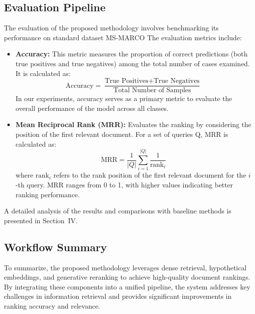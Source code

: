 \subsection{Evaluation Pipeline}
The evaluation of the proposed methodology involves benchmarking its performance on standard dataset MS-MARCO\cite{ms-marco} The evaluation metrics include:
\begin{itemize}
       \item \textbf{Accuracy:} This metric measures the proportion of correct predictions (both true positives and true negatives) among the total number of cases examined. It is calculated as:
    \begin{equation}
        \text{Accuracy} = \frac{\text{True Positives} + \text{True Negatives}}{\text{Total Number of Samples}}
    \end{equation}
    In our experiments, accuracy serves as a primary metric to evaluate the overall performance of the model across all classes.
        \item \textbf{Mean Reciprocal Rank (MRR):} Evaluates the ranking by considering the position of the first relevant document. For a set of queries Q, MRR is calculated as:
    \begin{equation}
        \text{MRR} = \frac{1}{|Q|} \sum_{i=1}^{|Q|} \frac{1}{\text{rank}_i}
    \end{equation}
    where $\text{rank}_i$ refers to the rank position of the first relevant document for the $i$-th query. MRR ranges from 0 to 1, with higher values indicating better ranking performance.
\end{itemize}

A detailed analysis of the results and comparisons with baseline methods is presented in Section~IV.

\subsection{Workflow Summary}
To summarize, the proposed methodology leverages dense retrieval, hypothetical embeddings, and generative reranking to achieve high-quality document rankings. By integrating these components into a unified pipeline, the system addresses key challenges in information retrieval and provides significant improvements in ranking accuracy and relevance.
